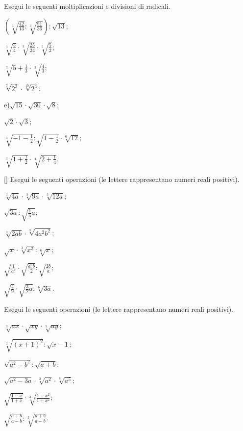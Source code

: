 \begin{esercizio}[\Ast]
 \label{ese:2.34}
Esegui le seguenti moltiplicazioni e divisioni di radicali.
 \begin{multicols}{3}
 \begin{enumeratea}
 \item $\left(\sqrt[3]{\frac{42}{13}}:\sqrt[3]{\frac{91}{36}}\right):\sqrt{13}$;
 \item $\sqrt[3]{\frac 3 4}\cdot \sqrt[3]{\frac{25}{24}}\cdot \sqrt[3]{\frac 5 2}$;
 \item $\sqrt[3]{5+\frac 1 3}\cdot \sqrt[3]{\frac 4 3}$;
 \item $\sqrt[5]{2^3}\cdot \sqrt[10]{2^4}$;
 \item e)$\sqrt{15}\cdot \sqrt{30}\cdot \sqrt 8$;
 \item $\sqrt 2\cdot \sqrt 3$;
 \item $\sqrt[3]{-1-\frac 1 2}:\sqrt{1-\frac 1 2}\cdot \sqrt[6]{12}$;
 \item $\sqrt[3]{1+\frac 1 2}\cdot \sqrt[4]{2+\frac 1 4}$.
 \end{enumeratea}
 \end{multicols}
\end{esercizio}

\begin{esercizio}
 \label{ese:2.35}[\Ast]
Esegui le seguenti operazioni (le lettere rappresentano numeri reali positivi).
 \begin{multicols}{3}
 \begin{enumeratea}
 \item $\sqrt[3]{4a}\cdot \sqrt[3]{9a}\cdot \sqrt[3]{12a}$;
 \item $\sqrt{3a}:\sqrt{\frac 1 5a}$;
 \item $\sqrt[3]{2ab}\cdot \sqrt[3]{4a^2b^2}$;
 \item $\sqrt x\cdot \sqrt[3]{x^2}:\sqrt[6]x$;
 \item $\sqrt{\frac 1{a^4}}\cdot \sqrt{\frac{a^6b} 2}:\sqrt{\frac{2b} a}$;
 \item $\sqrt{\frac 4 9}\cdot \sqrt{\frac 3 2a}:\sqrt[6]{3a}$.
 \end{enumeratea}
 \end{multicols}
\end{esercizio}

\begin{esercizio}[\Ast]
 \label{ese:2.36}
Esegui le seguenti operazioni (le lettere rappresentano numeri reali positivi).
 \begin{multicols}{3}
 \begin{enumeratea}
 \item $\sqrt[3]{ax}\cdot \sqrt{xy}\cdot \sqrt[5]{ay}$;
 \item $\sqrt[3]{(x+1)^2}:\sqrt{x-1}$;
 \item $\sqrt{a^2-b^2}:\sqrt{a+b}$;
 \item $\sqrt{a^2-3a}\cdot \sqrt[3]{a^2}\cdot \sqrt[6]{a^5}$;
 \item $\sqrt{\frac{1-x}{1+x}}\cdot \sqrt[3]{\frac{1-x^2}{1+x^2}}$;
 \item $\sqrt{\frac{a+b}{a-b}}:\sqrt[3]{\frac{a+b}{a-b}}$.
 \end{enumeratea}
 \end{multicols}
\end{esercizio}

